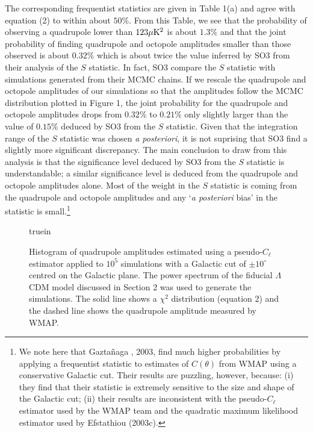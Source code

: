 The corresponding frequentist statistics are given in Table 1(a) and
agree with equation (2) to within about $50\%$. From this Table, we
see that the probability of observing a quadrupole lower than $123
\mk2$ is about $1.3 \%$ and that the joint probability of finding
quadrupole and octopole amplitudes smaller than those observed is
about $0.32\%$ which is about twice the value inferred by SO3 from
their analysis of the $S$ statistic. In fact, SO3 compare the $S$
statistic with simulations generated from their MCMC chains. If we
rescale the quadrupole and octopole amplitudes of our simulations so
that the amplitudes follow the MCMC distribution plotted in Figure 1,
the joint probability for the quadrupole and octopole amplitudes drops
from $0.32\%$ to $0.21\%$ only slightly larger than the value of
$0.15\%$ deduced by SO3 from the $S$ statistic. Given that the
integration range of the $S$ statistic was chosen {\it a posteriori},
it is not suprising that SO3 find a slightly more significant
discrepancy. The main conclusion to draw from this analysis is that
the significance level deduced by SO3 from the $S$ statistic is
understandable; a similar significance level is deduced from the
quadrupole and octopole amplitudes alone. Most of the weight in the
$S$ statistic is coming from the quadrupole and octopole amplitudes
and any `{\it a posteriori} bias' in the statistic is small.\footnote{
We note here that Gazta\~naga \etal, 2003, find much higher
probabilities by applying a frequentist statistic to estimates of
$C(\theta)$ from WMAP using a conservative Galactic cut. Their results
are puzzling, however, because: (i) they find that their statistic is
extremely sensitive to the size and shape of the Galactic cut; (ii)
their results are inconsistent with the pseudo-$C_\ell$ estimator
used by the WMAP team and the quadratic maximum likelihood
estimator used by Efstathiou (2003c).}


\begin{figure}

 truein


\caption
{Histogram of quadrupole amplitudes estimated using a pseudo-$C_\ell$
estimator applied to $10^5$ simulations with a Galactic cut of $\pm 10^\circ$
centred on the Galactic plane. The power spectrum of the fiducial $\Lambda$CDM
model discussed in Section 2 was used to generate the simulations. The solid
line shows a $\chi^2$ distribution (equation 2) and the dashed line shows the
quadrupole amplitude measured by WMAP.}

\label{figure2}

\end{figure}

